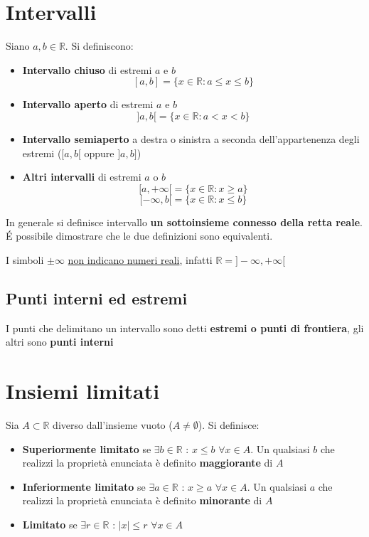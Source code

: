 \documentclass[10pt, oneside]{book}
\theoremstyle{plain}
\begin{document}
\section{Intervalli}
\begin{defin}
    Siano $a, b \in \mathbb{R}$. Si definiscono:
    \begin{itemize}[label = $\circ$]
        \item \textbf{Intervallo chiuso} di estremi $a$ e $b$
        \[[a,b] = \{x \in \mathbb{R} : a \leq x \leq b\}\]
        \item \textbf{Intervallo aperto} di estremi $a$ e $b$
        \[]a,b[ = \{x \in \mathbb{R} : a < x < b\}\]
        \item \textbf{Intervallo semiaperto} a destra o sinistra a seconda dell'appartenenza degli estremi ($[a,b[$ oppure $]a,b]$)
        \item \textbf{Altri intervalli} di estremi $a$ o $b$
        \[[a,+\infty[ = \{x \in \mathbb{R} : x \geq a\}\]
        \[[-\infty, b[ = \{x \in \mathbb{R} : x \leq b\}\]
    \end{itemize}
    In generale si definisce intervallo \textbf{un sottoinsieme connesso della retta reale}. \'E possibile dimostrare che le due definizioni sono equivalenti.
\end{defin}
\begin{oss}
    I simboli $\pm \infty$ \underline{non indicano numeri reali}, infatti $\mathbb{R} = ]-\infty, + \infty[$
\end{oss}

\subsection{Punti interni ed estremi}
\begin{defin}
    I punti che delimitano un intervallo sono detti \textbf{estremi o punti di frontiera}, gli altri sono \textbf{punti interni}
\end{defin}

\section{Insiemi limitati}
\begin{defin}
    Sia $A \subset \mathbb{R}$ diverso dall'insieme vuoto ($A \neq \emptyset$). Si definisce:
    \begin{itemize}
        \item \textbf{Superiormente limitato} se $\exists b \in \mathbb{R}$ : $x \leq b$ $\forall x \in A$. Un qualsiasi $b$ che realizzi la proprietà enunciata è definito \textbf{maggiorante} di $A$
        \item \textbf{Inferiormente limitato} se $\exists a \in \mathbb{R}$ : $x \geq a$ $\forall x \in A$. Un qualsiasi $a$ che realizzi la proprietà enunciata è definito \textbf{minorante} di $A$
        \item \textbf{Limitato} se $\exists r \in \mathbb{R}$ : $|x| \leq r$ $\forall x \in A$
    \end{itemize}
\end{defin}
\end{document}
